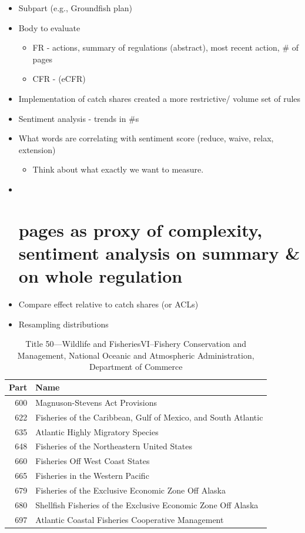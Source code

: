 \documentclass[
]{article}
\providecommand{\tightlist}{%
  \setlength{\itemsep}{0pt}\setlength{\parskip}{0pt}}
\begin{document}
\begin{itemize}
\item
  Subpart (e.g., Groundfish plan)
\item
  Body to evaluate

  \begin{itemize}
  \tightlist
  \item
    FR - actions, summary of regulations (abstract), most recent action, \# of pages
  \item
    CFR - (eCFR)
  \end{itemize}
\item
  Implementation of catch shares created a more restrictive/ volume set of rules
\item
  Sentiment analysis - trends in \#s
\item
  What words are correlating with sentiment score (reduce, waive, relax, extension)

  \begin{itemize}
  \tightlist
  \item
    Think about what exactly we want to measure.
  \end{itemize}
\item ~
  \hypertarget{pages-as-proxy-of-complexity-sentiment-analysis-on-summary-on-whole-regulation}{%
  \section{pages as proxy of complexity, sentiment analysis on summary \& on whole regulation}\label{pages-as-proxy-of-complexity-sentiment-analysis-on-summary-on-whole-regulation}}
\item
  Compare effect relative to catch shares (or ACLs)
\item
  Resampling distributions
\end{itemize}

\begin{table}

\caption{\label{tab:cfr-part-table}Title 50---Wildlife and Fisheries\nCHAPTER VI--Fishery Conservation and Management, National Oceanic and Atmospheric Administration, Department of Commerce}
\centering
\begin{tabular}[t]{r|l}
\hline
Part & Name\\
\hline
600 & Magnuson-Stevens Act Provisions\\
\hline
622 & Fisheries of the Caribbean, Gulf of Mexico, and South Atlantic\\
\hline
635 & Atlantic Highly Migratory Species\\
\hline
648 & Fisheries of the Northeastern United States\\
\hline
660 & Fisheries Off West Coast States\\
\hline
665 & Fisheries in the Western Pacific\\
\hline
679 & Fisheries of the Exclusive Economic Zone Off Alaska\\
\hline
680 & Shellfish Fisheries of the Exclusive Economic Zone Off Alaska\\
\hline
697 & Atlantic Coastal Fisheries Cooperative Management\\
\hline
\end{tabular}
\end{table}
\end{document}
